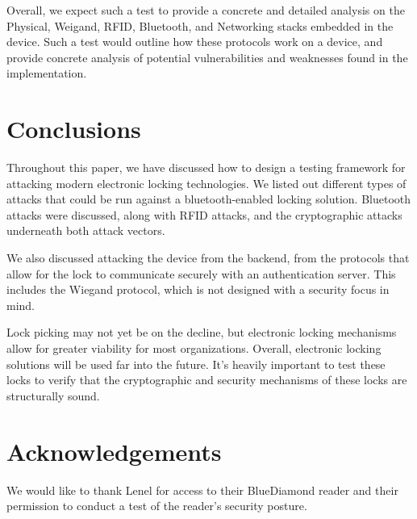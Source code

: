 \documentclass[10pt,twocolumn,letterpaper]{article}
\begin{document}
Overall, we expect such a test to provide a concrete and detailed analysis on the Physical, Weigand, RFID, Bluetooth, and Networking stacks embedded in the device.  Such a test would outline how these protocols work on a device, and provide concrete analysis of potential vulnerabilities and weaknesses found in the implementation. 

\section{Conclusions}
Throughout this paper, we have discussed how to design a testing framework for attacking modern electronic locking technologies.  We listed out different types of attacks that could be run against a bluetooth-enabled locking solution.  Bluetooth attacks were discussed, along with RFID attacks, and the cryptographic attacks underneath both attack vectors.

We also discussed attacking the device from the backend, from the protocols that allow for the lock to communicate securely with an authentication server.  This includes the Wiegand protocol, which is not designed with a security focus in mind.

Lock picking may not yet be on the decline, but electronic locking mechanisms allow for greater viability for most organizations. Overall, electronic locking solutions will be used far into the future.  It's heavily important to test these locks to verify that the cryptographic and security mechanisms of these locks are structurally sound.

\section{Acknowledgements}
We would like to thank Lenel for access to their BlueDiamond reader and their permission to conduct a test of the reader's security posture.



\end{document}

